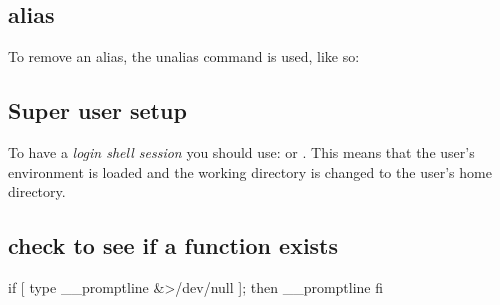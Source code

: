 \subsection{alias}
To remove an alias, the unalias command is used, like so:

\subsection{Super user setup}
To have a \textit{login shell session} you should use:
 or . This means that the user’s environment is loaded and the working directory is changed to the user’s home directory. 

\subsection{check to see if a function exists}
\begin{bashcode}
	if [ type __promptline \&>/dev/null ]; then
		__promptline
	fi       
\end{bashcode}
